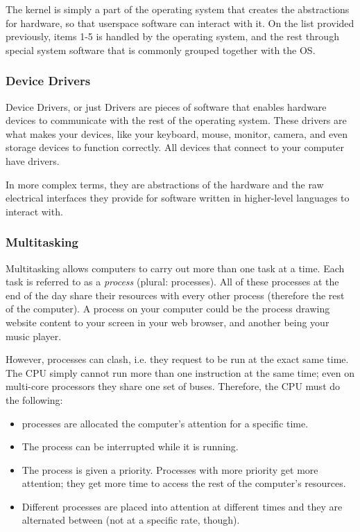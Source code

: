 \documentclass[../main.tex]{subfiles}
\begin{document}
The kernel is simply a part of the operating system that creates the abstractions for hardware, so that userspace software can interact with it. On the list provided previously, items 1-5 is handled by the operating system, and the rest through special system software that is commonly grouped together with the OS. 

\subsubsection{Device Drivers}

Device Drivers, or just Drivers are pieces of software that enables hardware devices to communicate with the rest of the operating system. These drivers are what makes your devices, like your keyboard, mouse, monitor, camera, and even storage devices to function correctly. All devices that connect to your computer have drivers. 

In more complex terms, they are abstractions of the hardware and the raw electrical interfaces they provide for software written in higher-level languages to interact with.

\subsubsection{Multitasking}

Multitasking allows computers to carry out more than one task at a time. Each task is referred to as a \emph{process} (plural: processes). All of these processes at the end of the day share their resources with every other process (therefore the rest of the computer). A process on your computer could be the process drawing website content to your screen in your web browser, and another being your music player.

However, processes can clash, i.e. they request to be run at the exact same time. The CPU simply cannot run more than one instruction at the same time; even on multi-core processors they share one set of buses. Therefore, the CPU must do the following:

\begin{itemize}
    \item processes are allocated the computer's attention for a specific time.
    \item The process can be interrupted while it is running.
    \item The process is given a priority. Processes with more priority get more attention; they get more time to access the rest of the computer's resources. 
    \item Different processes are placed into attention at different times and they are alternated between (not at a specific rate, though).
\end{itemize}
\end{document}
